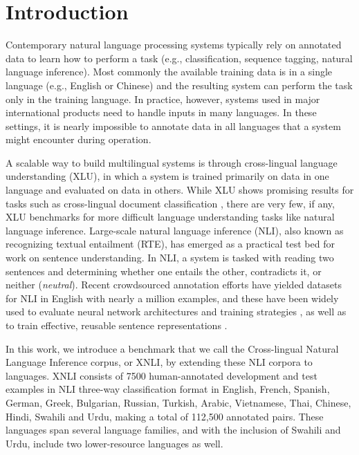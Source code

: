 \documentclass[11pt,a4paper]{article}
\begin{document}
\section{Introduction}

Contemporary natural language processing systems typically rely on annotated data to learn how to perform a task (e.g., classification, sequence tagging, natural language inference).
Most commonly the available training data is in a single language (e.g., English or Chinese) and the resulting system can perform the task only in the training language. In practice, however, systems used in major international products 
need to handle inputs in many languages. In these settings, it is nearly impossible to annotate data in  all languages that a system might encounter during operation. 

A scalable way to build multilingual systems is through cross-lingual language understanding (XLU), in which a system is trained primarily on data in one language and evaluated on data in others.
While XLU shows promising results for tasks such as cross-lingual document classification \cite{Klementiev:2012:coling_reuters,Schwenk:2018:lrec_mldoc}, there are very few, if any, XLU benchmarks for more difficult language understanding tasks like natural language inference.
Large-scale natural language inference (NLI), also known as recognizing textual entailment (RTE), has emerged as a practical test bed for work on sentence understanding. In NLI, a system is tasked with reading two sentences and determining whether one entails the other, contradicts it, or neither (\textit{neutral}). Recent crowdsourced annotation efforts have yielded datasets for NLI in English \cite{bowman2015large,multinli:2017} with nearly a million examples, and these have been widely used to evaluate neural network architectures and training strategies \cite{rocktaschel2015reasoning, gong2017natural, peters2018deep, wang2018glue}, as well as to train effective, reusable sentence representations  \cite{conneau2017supervised,subramanian2018learning, cer2018universal,conneau2018craminto}.

In this work, we introduce a benchmark that we call the Cross-lingual Natural Language Inference corpus, or XNLI, by extending these NLI corpora to \nlangs languages.  
XNLI consists of 7500 human-annotated development and test examples in NLI three-way classification format in 
English, French, Spanish, German, Greek, Bulgarian, Russian, Turkish, Arabic, Vietnamese, Thai, Chinese, Hindi, Swahili and Urdu, making a total of 112,500 annotated pairs. These languages span several language families, and with the inclusion of Swahili and Urdu, include two lower-resource languages as well. 
\end{document}
